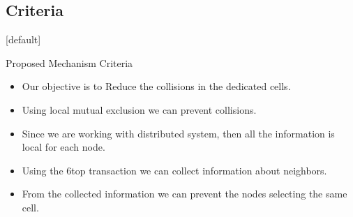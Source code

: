 \documentclass{beamer}
\makeatletter
\newenvironment{withoutheadline}{
        \setbeamertemplate{headline}[default]
        \def\beamer@entrycode{\vspace*{-\headheight}}
    }{}
\makeatother
\begin{document}
\subsection{Criteria}
\begin{withoutheadline}
\begin{frame}{Proposed Mechanism Criteria}
\begin{itemize}
    \item Our objective is to Reduce the collisions in the dedicated cells.\pause
    \item Using local mutual exclusion we can prevent collisions.\pause  
    \item Since we are working with distributed system, then all the information is local for each node. \pause
    \item Using the 6top transaction we can collect information about neighbors. \pause
    \item From the collected information we can prevent the nodes selecting the same cell. \pause
    \end{itemize}

\end{frame}
\end{withoutheadline}
\end{document}
